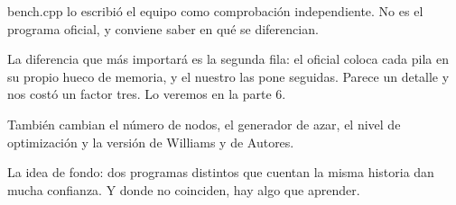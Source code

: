 bench.cpp lo escribió el equipo como comprobación independiente. No es el programa oficial, y conviene saber en qué se diferencian.

La diferencia que más importará es la segunda fila: el oficial coloca cada pila en su propio hueco de memoria, y el nuestro las pone seguidas. Parece un detalle y nos costó un factor tres. Lo veremos en la parte 6.

También cambian el número de nodos, el generador de azar, el nivel de optimización y la versión de Williams y de Autores.

La idea de fondo: dos programas distintos que cuentan la misma historia dan mucha confianza. Y donde no coinciden, hay algo que aprender.
